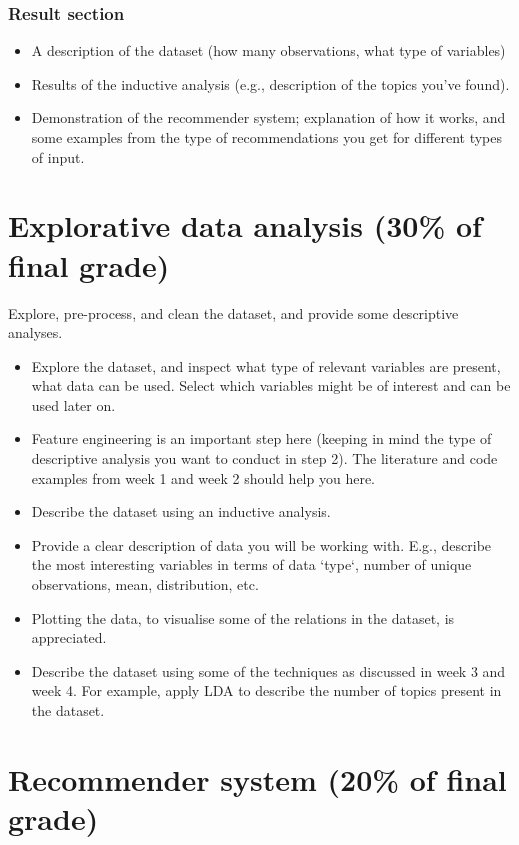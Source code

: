 \subsubsection{Result section}
\begin{itemize}
	\item A description of the dataset (how many observations, what type of variables)
	\item Results of the inductive analysis (e.g., description of the topics you've found).
	\item Demonstration of the recommender system; explanation of how it works, and some examples from the type of recommendations you get for different types of input.
\end{itemize}

\section{Explorative data analysis (30\% of final grade)}

Explore, pre-process, and clean the dataset, and provide some descriptive analyses.

\begin{itemize}
	\item  Explore the dataset, and inspect what type of relevant variables are present, what data can be used. Select which variables might be of interest and can be used later on.
	\item Feature engineering is an important step here (keeping in mind the type of descriptive analysis you want to conduct in step 2). The literature and code examples from week 1 and week 2 should help you here.
	\item Describe the dataset using an inductive analysis.
	\item Provide a clear description of data you will be working with. E.g., describe the most interesting variables in terms of data `type`, number of unique observations, mean, distribution, etc.
	\item  Plotting the data, to visualise some of the relations in the dataset, is appreciated.
	\item  Describe the dataset using some of the techniques as discussed in week 3 and week 4. For example, apply LDA to describe the number of topics present in the dataset.
\end{itemize}

\section{Recommender system (20\% of final grade)}

